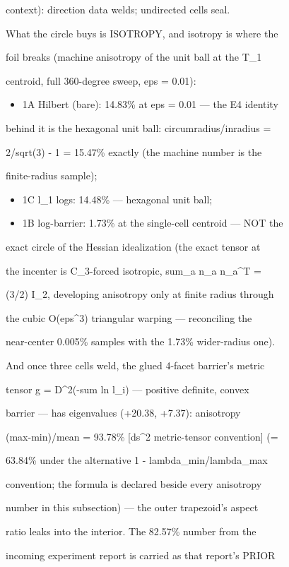 \documentclass[11pt,a4paper]{article}
\theoremstyle{definition}
\begin{document}
context): direction data welds; undirected cells seal.


What the circle buys is ISOTROPY, and isotropy is where the

foil breaks (machine anisotropy of the unit ball at the T\_1

centroid, full 360-degree sweep, eps = 0.01):


\begin{itemize}[leftmargin=1.4em]
\item 1A Hilbert (bare): 14.83\% at eps = 0.01 — the E4 identity
\end{itemize}
    behind it is the hexagonal unit ball: circumradius/inradius =

    2/sqrt(3) - 1 = 15.47\% exactly (the machine number is the

    finite-radius sample);

\begin{itemize}[leftmargin=1.4em]
\item 1C l\_1 logs: 14.48\% — hexagonal unit ball;
\item 1B log-barrier: 1.73\% at the single-cell centroid — NOT the
\end{itemize}
    exact circle of the Hessian idealization (the exact tensor at

    the incenter is C\_3-forced isotropic, sum\_a n\_a n\_a\^{}T =

    (3/2) I\_2, developing anisotropy only at finite radius through

    the cubic O(eps\^{}3) triangular warping — reconciling the

    near-center 0.005\% samples with the 1.73\% wider-radius one).

    And once three cells weld, the glued 4-facet barrier's metric

    tensor g = D\^{}2(-sum ln l\_i) — positive definite, convex

    barrier — has eigenvalues (+20.38, +7.37): anisotropy

    (max-min)/mean = 93.78\% [ds\^{}2 metric-tensor convention] (=

    63.84\% under the alternative 1 - lambda\_min/lambda\_max

    convention; the formula is declared beside every anisotropy

    number in this subsection) — the outer trapezoid's aspect

    ratio leaks into the interior. The 82.57\% number from the

    incoming experiment report is carried as that report's PRIOR
\end{document}
